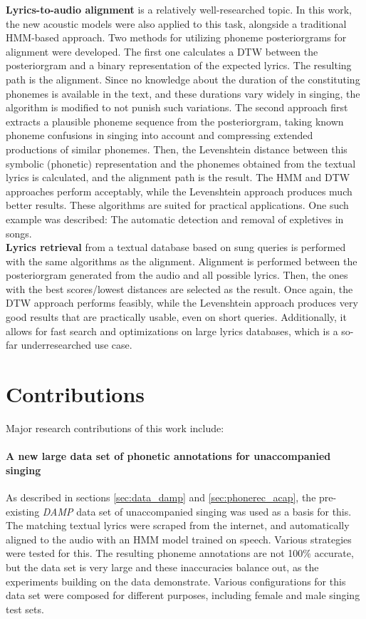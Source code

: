 \textbf{Lyrics-to-audio alignment} is a relatively well-researched topic. In this work, the new acoustic models were also applied to this task, alongside a traditional HMM-based approach. Two methods for utilizing phoneme posteriorgrams for alignment were developed. The first one calculates a DTW between the posteriorgram and a binary representation of the expected lyrics. The resulting path is the alignment. Since no knowledge about the duration of the constituting phonemes is available in the text, and these durations vary widely in singing, the algorithm is modified to not punish such variations. The second approach first extracts a plausible phoneme sequence from the posteriorgram, taking known phoneme confusions in singing into account and compressing extended productions of similar phonemes. Then, the Levenshtein distance between this symbolic (phonetic) representation and the phonemes obtained from the textual lyrics is calculated, and the alignment path is the result.
The HMM and DTW approaches perform acceptably, while the Levenshtein approach produces much better results. These algorithms are suited for practical applications. One such example was described: The automatic detection and removal of expletives in songs.\\

\textbf{Lyrics retrieval} from a textual database based on sung queries is performed with the same algorithms as the alignment. Alignment is performed between the posteriorgram generated from the audio and all possible lyrics. Then, the ones with the best scores/lowest distances are selected as the result.
Once again, the DTW approach performs feasibly, while the Levenshtein approach produces very good results that are practically usable, even on short queries. Additionally, it allows for fast search and optimizations on large lyrics databases, which is a so-far underresearched use case.

\section{Contributions}


Major research contributions of this work include:

\paragraph{A new large data set of phonetic annotations for unaccompanied singing}
As described in sections \ref{sec:data_damp} and \ref{sec:phonerec_acap}, the pre-existing \textit{DAMP} data set of unaccompanied singing was used as a basis for this. The matching textual lyrics were scraped from the internet, and automatically aligned to the audio with an HMM model trained on speech. Various strategies were tested for this. The resulting phoneme annotations are not 100\% accurate, but the data set is very large and these inaccuracies balance out, as the experiments building on the data demonstrate. Various configurations for this data set were composed for different purposes, including female and male singing test sets.

